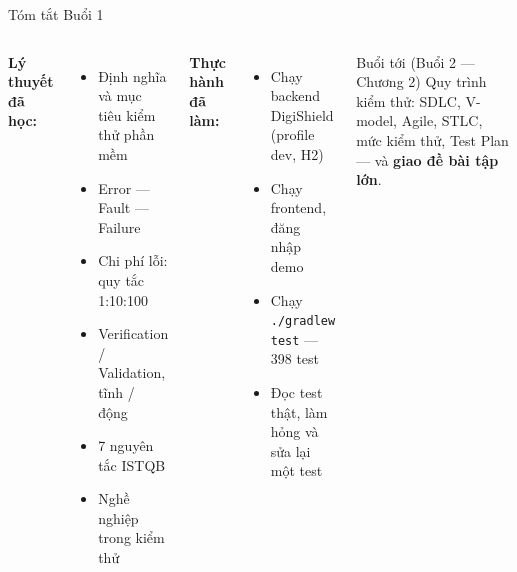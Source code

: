 \documentclass[aspectratio=169,12pt]{beamer}
\begin{document}
\begin{frame}{Tóm tắt Buổi 1}
  \begin{columns}
    \textbf{Lý thuyết đã học:}
    \begin{itemize}
      \item Định nghĩa và mục tiêu kiểm thử phần mềm
      \item Error --- Fault --- Failure
      \item Chi phí lỗi: quy tắc 1:10:100
      \item Verification / Validation, tĩnh / động
      \item 7 nguyên tắc ISTQB
      \item Nghề nghiệp trong kiểm thử
    \end{itemize}

    \textbf{Thực hành đã làm:}
    \begin{itemize}
      \item Chạy backend DigiShield (profile dev, H2)
      \item Chạy frontend, đăng nhập demo
      \item Chạy \texttt{./gradlew test} --- 398 test
      \item Đọc test thật, làm hỏng và sửa lại một test
    \end{itemize}

    \vspace{0.4em}
    \begin{block}{Buổi tới (Buổi 2 --- Chương 2)}
      Quy trình kiểm thử: SDLC, V-model, Agile, STLC, mức kiểm thử,
      Test Plan --- và \textbf{giao đề bài tập lớn}.
    \end{block}
  \end{columns}
\end{frame}
\end{document}
